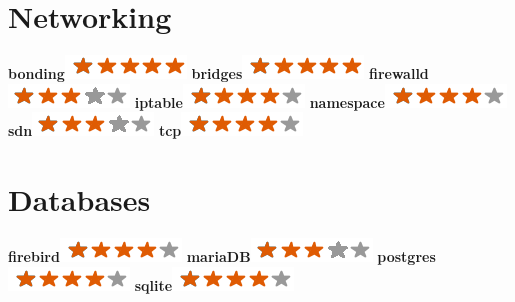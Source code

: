 \documentclass[]{friggeri-cv}
\begin{document}
\begin{aside}
    \section{Networking}
        \textbf{bonding}\includegraphics[scale=0.40]{img/5stars.png}
        \textbf{bridges}\includegraphics[scale=0.40]{img/5stars.png}
        \textbf{firewalld}\includegraphics[scale=0.40]{img/3stars.png}
        \textbf{iptable}\includegraphics[scale=0.40]{img/4stars.png}
        \textbf{namespace}\includegraphics[scale=0.40]{img/4stars.png}
        \textbf{sdn}\includegraphics[scale=0.40]{img/3stars.png}
        \textbf{tcp}\includegraphics[scale=0.40]{img/4stars.png}
        ~
    \section{Databases}
        \textbf{firebird}\includegraphics[scale=0.40]{img/4stars.png}
        \textbf{mariaDB}\includegraphics[scale=0.40]{img/3stars.png}
        \textbf{postgres}\includegraphics[scale=0.40]{img/4stars.png}
        \textbf{sqlite}\includegraphics[scale=0.40]{img/4stars.png}
        ~

\end{aside}
\end{document}

